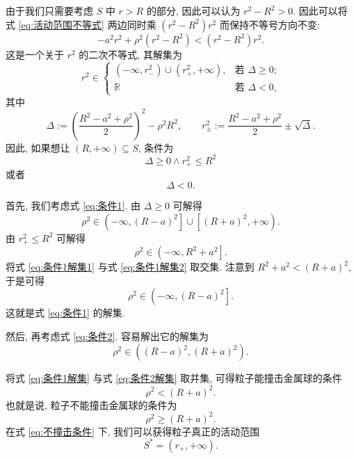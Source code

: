 \documentclass{article}
\begin{document}
由于我们只需要考虑 $S$ 中 $r>R$ 的部分, 因此可以认为 $r^2-R^2>0$.
因此可以将式 \ref{eq:活动范围不等式} 两边同时乘 $\left(r^2-R^2\right)r^2$ 而保持不等号方向不变:
\begin{equation}
	-a^2r^2+\rho^2\left(r^2-R^2\right)<\left(r^2-R^2\right)r^2.
\end{equation}
这是一个关于 $r^2$ 的二次不等式, 其解集为
\begin{equation}
	r^2\in
	\begin{cases}\left(-\infty,r_-^2\right)\cup\left(r_+^2,+\infty\right),
	&\text{若 $\Delta\ge0$;}\\
	\mathbb R&\text{若 $\Delta<0$,}\end{cases}
\end{equation}
其中
\begin{equation}
	\label{eq:Delta,r_pm}
	\Delta:=\left(\frac{R^2-a^2+\rho^2}2\right)^2-\rho^2R^2,
	\qquad r_\pm^2:=\frac{R^2-a^2+\rho^2}2\pm\sqrt\Delta.
\end{equation}
因此, 如果想让 $\left(R,+\infty\right)\subseteq S$, 条件为
\begin{equation}
	\label{eq:条件1}
	\Delta\ge0\land r_+^2\le R^2
\end{equation}
或者
\begin{equation}
	\label{eq:条件2}
	\Delta<0.
\end{equation}

首先, 我们考虑式 \ref{eq:条件1}.
由 $\Delta\ge0$ 可解得
\begin{equation}
	\label{eq:条件1解集1}
	\rho^2\in\left(-\infty,\left(R-a\right)^2\right]
	\cup\left[\left(R+a\right)^2,+\infty\right).
\end{equation}
由 $r_+^2\le R^2$ 可解得
\begin{equation}
	\label{eq:条件1解集2}
	\rho^2\in\left(-\infty,R^2+a^2\right].
\end{equation}
将式 \ref{eq:条件1解集1} 与式 \ref{eq:条件1解集2} 取交集.
注意到 $R^2+a^2<\left(R+a\right)^2$, 于是可得
\begin{equation}
	\label{eq:条件1解集}
	\rho^2\in\left(-\infty,\left(R-a\right)^2\right].
\end{equation}
这就是式 \ref{eq:条件1} 的解集.

然后, 再考虑式 \ref{eq:条件2}.
容易解出它的解集为
\begin{equation}
	\label{eq:条件2解集}
	\rho^2\in\left(\left(R-a\right)^2,\left(R+a\right)^2\right).
\end{equation}

将式 \ref{eq:条件1解集} 与式 \ref{eq:条件2解集} 取并集, 可得粒子能撞击金属球的条件
\begin{equation}
	\rho^2<\left(R+a\right)^2.
\end{equation}
也就是说, 粒子不能撞击金属球的条件为
\begin{equation}
	\label{eq:不撞击条件}
	\rho^2\ge\left(R+a\right)^2.
\end{equation}
在式 \ref{eq:不撞击条件} 下, 我们可以获得粒子真正的活动范围
\begin{equation}
	\label{eq:真正的活动范围}
	S^*=\left(r_+,+\infty\right).
\end{equation}
\end{document}
